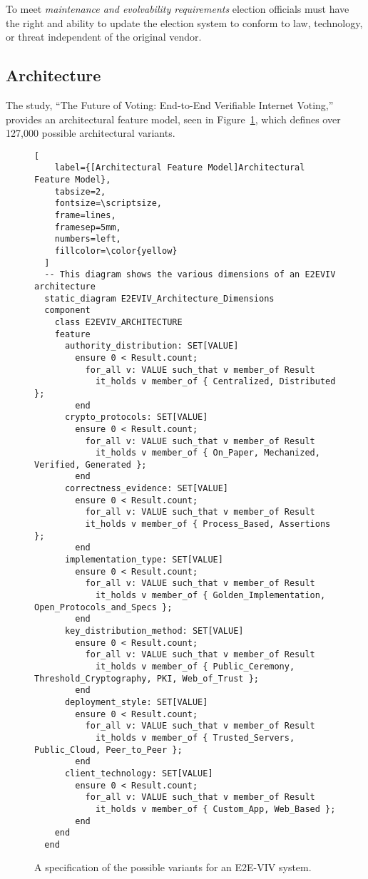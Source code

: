 To meet \emph{maintenance and evolvability requirements} election officials must
have the right and ability to update the election system to conform to law,
technology, or threat independent of the original vendor.

\subsection{Architecture}
The study, ``The Future of Voting: End-to-End Verifiable Internet Voting,''
provides an architectural feature model, seen in Figure~\ref{fig:viv-model},
which defines over 127,000 possible architectural variants.\cite{e2e-viv}

\begin{figure}[H]
  \begin{Verbatim}[
    label={[Architectural Feature Model]Architectural Feature Model},
    tabsize=2,
    fontsize=\scriptsize,
    frame=lines,
    framesep=5mm,
    numbers=left,
    fillcolor=\color{yellow}
  ]
  -- This diagram shows the various dimensions of an E2EVIV architecture
  static_diagram E2EVIV_Architecture_Dimensions
  component
    class E2EVIV_ARCHITECTURE
    feature
      authority_distribution: SET[VALUE]
        ensure 0 < Result.count;
          for_all v: VALUE such_that v member_of Result
            it_holds v member_of { Centralized, Distributed };
        end
      crypto_protocols: SET[VALUE]
        ensure 0 < Result.count;
          for_all v: VALUE such_that v member_of Result
            it_holds v member_of { On_Paper, Mechanized, Verified, Generated };
        end
      correctness_evidence: SET[VALUE]
        ensure 0 < Result.count;
          for_all v: VALUE such_that v member_of Result
          it_holds v member_of { Process_Based, Assertions };
        end
      implementation_type: SET[VALUE]
        ensure 0 < Result.count;
          for_all v: VALUE such_that v member_of Result
            it_holds v member_of { Golden_Implementation, Open_Protocols_and_Specs };
        end
      key_distribution_method: SET[VALUE]
        ensure 0 < Result.count;
          for_all v: VALUE such_that v member_of Result
            it_holds v member_of { Public_Ceremony, Threshold_Cryptography, PKI, Web_of_Trust };
        end
      deployment_style: SET[VALUE]
        ensure 0 < Result.count;
          for_all v: VALUE such_that v member_of Result
            it_holds v member_of { Trusted_Servers, Public_Cloud, Peer_to_Peer };
        end
      client_technology: SET[VALUE]
        ensure 0 < Result.count;
          for_all v: VALUE such_that v member_of Result
            it_holds v member_of { Custom_App, Web_Based };
        end
    end
  end
  \end{Verbatim}
  \caption{A specification of the possible variants for an E2E-VIV system.\cite{e2e-viv}}\label{fig:viv-model}
\end{figure}

